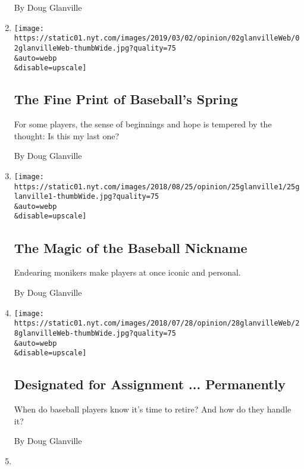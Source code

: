 \begin{enumerate}
  By Doug Glanville
\item
  \href{/2019/03/01/opinion/glanville-baseball-spring-training.html}{}

  \texttt{[image: https://static01.nyt.com/images/2019/03/02/opinion/02glanvilleWeb/02glanvilleWeb-thumbWide.jpg?quality=75\\\&auto=webp\\\&disable=upscale]}

  \hypertarget{the-fine-print-of-baseballs-spring}{%
  \subsection{The Fine Print of Baseball's
  Spring}\label{the-fine-print-of-baseballs-spring}}

  For some players, the sense of beginnings and hope is tempered by the
  thought: Is this my last one?

  By Doug Glanville
\item
  \href{/2018/08/25/opinion/baseball-nicknames.html}{}

  \texttt{[image: https://static01.nyt.com/images/2018/08/25/opinion/25glanville1/25glanville1-thumbWide.jpg?quality=75\\\&auto=webp\\\&disable=upscale]}

  \hypertarget{the-magic-of-the-baseball-nickname}{%
  \subsection{The Magic of the Baseball
  Nickname}\label{the-magic-of-the-baseball-nickname}}

  Endearing monikers make players at once iconic and personal.

  By Doug Glanville
\item
  \href{/2018/07/27/opinion/baseball-retirement-chase-utley-mlb-dodgers-phillies.html}{}

  \texttt{[image: https://static01.nyt.com/images/2018/07/28/opinion/28glanvilleWeb/28glanvilleWeb-thumbWide.jpg?quality=75\\\&auto=webp\\\&disable=upscale]}

  \hypertarget{designated-for-assignment--permanently}{%
  \subsection{Designated for Assignment ...
  Permanently}\label{designated-for-assignment--permanently}}

  When do baseball players know it's time to retire? And how do they
  handle it?

  By Doug Glanville
\item
  \href{/2018/04/06/opinion/baseballs-unwritten-rules.html}{}


\end{enumerate}
